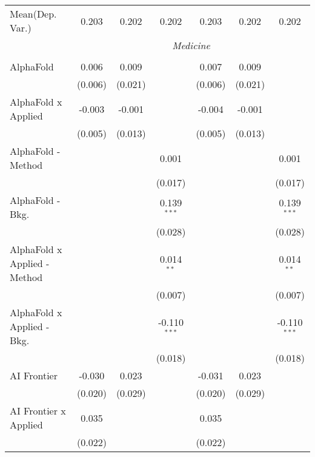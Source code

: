 \begin{tabular}{lcccccc}
Mean(Dep. Var.) & 0.203 & 0.202 & 0.202 & 0.203 & 0.202 & 0.202 \\
 & \multicolumn{6}{c}{\textit{Medicine}} \\ \\
   AlphaFold                    & 0.006        & 0.009     &                & 0.007        & 0.009     &   \\   
                                & (0.006)      & (0.021)   &                & (0.006)      & (0.021)   &   \\   
   AlphaFold x Applied          & -0.003       & -0.001    &                & -0.004       & -0.001    &   \\   
                                & (0.005)      & (0.013)   &                & (0.005)      & (0.013)   &   \\   
   AlphaFold - Method           &              &           & 0.001          &              &           & 0.001\\   
                                &              &           & (0.017)        &              &           & (0.017)\\   
   AlphaFold - Bkg.             &              &           & 0.139$^{***}$  &              &           & 0.139$^{***}$\\   
                                &              &           & (0.028)        &              &           & (0.028)\\   
   AlphaFold x Applied - Method &              &           & 0.014$^{**}$   &              &           & 0.014$^{**}$\\   
                                &              &           & (0.007)        &              &           & (0.007)\\   
   AlphaFold x Applied - Bkg.   &              &           & -0.110$^{***}$ &              &           & -0.110$^{***}$\\   
                                &              &           & (0.018)        &              &           & (0.018)\\   
   AI Frontier                  & -0.030       & 0.023     &                & -0.031       & 0.023     &   \\   
                                & (0.020)      & (0.029)   &                & (0.020)      & (0.029)   &   \\   
   AI Frontier x Applied        & 0.035        &           &                & 0.035        &           &   \\   
                                & (0.022)      &           &                & (0.022)      &           &   \\   

\end{tabular}
